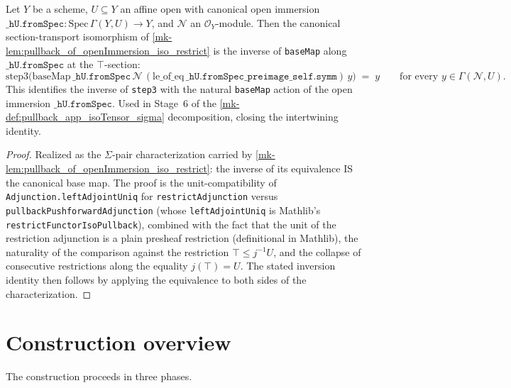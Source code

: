 \begin{lemma}
  \label{mk-lem:baseMap_inv_step3_open_immersion}
  \leanok

  Let \(Y\) be a scheme, \(U \subseteq Y\) an affine open with
  canonical open immersion
  \(\mathtt{\_hU.fromSpec} : \text{Spec}\,\Gamma(Y, U) \to Y\), and
  \(\mathcal N\) an \(\mathcal O_Y\)-module. Then the canonical
  section-transport isomorphism of
  \ref{mk-lem:pullback_of_openImmersion_iso_restrict} is the inverse
  of \texttt{baseMap} along \(\mathtt{\_hU.fromSpec}\) at the
  \(\top\)-section:
  \[
    \text{step3}\bigl(
      \text{baseMap}\,\mathtt{\_hU.fromSpec}\,
        \mathcal N\,
        (\text{le\_of\_eq}\,\mathtt{\_hU.fromSpec\_preimage\_self.symm})\,y
    \bigr) \;=\; y
    \qquad\text{for every } y \in \Gamma(\mathcal N, U).
  \]
  This identifies the inverse of \texttt{step3} with the natural
  \texttt{baseMap} action of the open immersion
  \(\mathtt{\_hU.fromSpec}\). Used in Stage~6 of the
  \ref{mk-def:pullback_app_isoTensor_sigma} decomposition, closing the
  intertwining identity.
\end{lemma}
\begin{proof}
  \leanok
  Realized as the \(\Sigma\)-pair characterization carried by
  \ref{mk-lem:pullback_of_openImmersion_iso_restrict}: the inverse of
  its equivalence IS the canonical base map. The proof is the
  unit-compatibility of \texttt{Adjunction.leftAdjointUniq} for
  \texttt{restrictAdjunction} versus
  \texttt{pullbackPushforwardAdjunction} (whose
  \texttt{leftAdjointUniq} is Mathlib's
  \texttt{restrictFunctorIsoPullback}), combined with the fact that
  the unit of the restriction adjunction is a plain presheaf
  restriction (definitional in Mathlib), the naturality of the
  comparison against the restriction
  \(\top \le j^{-1}U\), and the collapse of consecutive
  restrictions along the equality \(j(\top) = U\). The stated
  inversion identity then follows by applying the equivalence to both
  sides of the characterization.
\end{proof}

\section{Construction overview}
The construction proceeds in three phases.

